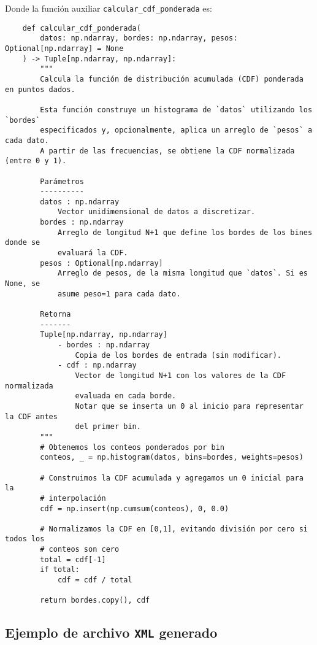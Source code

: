 \noindent Donde la función auxiliar \texttt{calcular\_cdf\_ponderada} es:

\begin{verbatim}
    def calcular_cdf_ponderada(
        datos: np.ndarray, bordes: np.ndarray, pesos: Optional[np.ndarray] = None
    ) -> Tuple[np.ndarray, np.ndarray]:
        """
        Calcula la función de distribución acumulada (CDF) ponderada en puntos dados.
    
        Esta función construye un histograma de `datos` utilizando los `bordes`
        especificados y, opcionalmente, aplica un arreglo de `pesos` a cada dato.
        A partir de las frecuencias, se obtiene la CDF normalizada (entre 0 y 1).
    
        Parámetros
        ----------
        datos : np.ndarray
            Vector unidimensional de datos a discretizar.
        bordes : np.ndarray
            Arreglo de longitud N+1 que define los bordes de los bines donde se 
            evaluará la CDF.
        pesos : Optional[np.ndarray]
            Arreglo de pesos, de la misma longitud que `datos`. Si es None, se 
            asume peso=1 para cada dato.
    
        Retorna
        -------
        Tuple[np.ndarray, np.ndarray]
            - bordes : np.ndarray
                Copia de los bordes de entrada (sin modificar).
            - cdf : np.ndarray
                Vector de longitud N+1 con los valores de la CDF normalizada 
                evaluada en cada borde.
                Notar que se inserta un 0 al inicio para representar la CDF antes 
                del primer bin.
        """
        # Obtenemos los conteos ponderados por bin
        conteos, _ = np.histogram(datos, bins=bordes, weights=pesos)
    
        # Construimos la CDF acumulada y agregamos un 0 inicial para la 
        # interpolación
        cdf = np.insert(np.cumsum(conteos), 0, 0.0)
    
        # Normalizamos la CDF en [0,1], evitando división por cero si todos los 
        # conteos son cero
        total = cdf[-1]
        if total:
            cdf = cdf / total
    
        return bordes.copy(), cdf
\end{verbatim}

\subsection{Ejemplo de archivo \texttt{XML} generado}\label{subsec:xml_generado}

